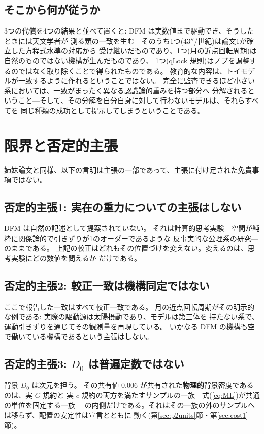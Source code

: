 \documentclass[a4paper,10pt,twocolumn]{ltjsarticle}
\begin{document}
\subsection{そこから何が従うか}
\label{sec:follows}

3つの代償を4つの結果と並べて置くと: DFM は実数値まで駆動でき、そうしたときには天文学者が
測る類の一致を生む---そのうち1つ($43''$/世紀)は論文1が確立した方程式水準の対応から
受け継いだものであり、1つ(月の近点回転周期)は自然のものではない機構が生んだものであり、
1つ(qLock 規則)はノブを調整するのではなく取り除くことで得られたものである。
教育的な内容は、トイモデルが一致するように作れるということではない。
完全に監査できるほど小さい系においては、一致がまったく異なる認識論的重みを持つ部分へ
分解されるということ---そして、その分解を自分自身に対して行わないモデルは、それらすべてを
同じ種類の成功として提示してしまうということである。

\section{限界と否定的主張}
\label{sec:negative}

姉妹論文と同様、以下の言明は主張の一部であって、主張に付け足された免責事項ではない。

\subsection{否定的主張1: 実在の重力についての主張はしない}
DFM は自然の記述として提案されていない。
それは計算的思考実験---空間が純粋に関係論的で引きずりが1のオーダーであるような
反事実的な公理系の研究---のままである。
上記の較正はどれもその位置づけを変えない。変えるのは、思考実験にどの数値を問えるか
だけである。

\subsection{否定的主張2: 較正一致は機構同定ではない}
ここで報告した一致はすべて較正一致である。
月の近点回転周期がその明示的な例である: 実際の駆動源は太陽摂動であり、モデルは第三体を
持たない系で、運動引きずりを通じてその観測量を再現している。
いかなる DFM の機構も空で働いている機構であるという主張はしない。

\subsection{否定的主張3: \texorpdfstring{$D_0$}{D0} は普遍定数ではない}
背景 $D_0$ は次元を担う。
その共有値 $0.006$ が共有された\textbf{物理的}背景密度であるのは、実 $G$ 規約と
実 $c$ 規約の両方を満たすサンプルの一族---式(\ref{eq:ML})が共通の単位を固定する一族---
の内側だけである。それはその一族の外のサンプルへは移らず、配置の安定性は宣言とともに
動く(第\ref{sec:p2units}節・第\ref{sec:cost1}節)。
\end{document}
